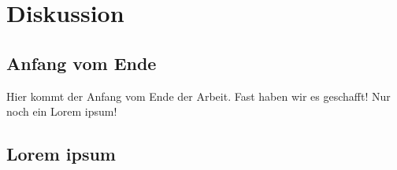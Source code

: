 \chapter{Diskussion}

\section{Anfang vom Ende}

Hier kommt der Anfang vom Ende der Arbeit.
Fast haben wir es geschafft! Nur noch ein Lorem ipsum!

\section{Lorem ipsum}


